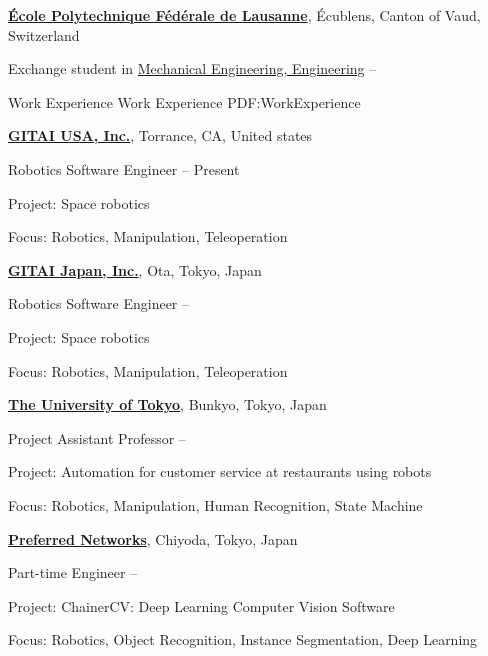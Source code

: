 \documentclass[letterpaper,MMMyyyy,nonstopmode]{simpleresumecv}
\begin{document}
\begin{Body}
\Gap
\Entry
\href{https://www.epfl.ch/en/}
{\textbf{École Polytechnique Fédérale de Lausanne}},
Écublens, Canton of Vaud, Switzerland
\Gap

\Gap
Exchange student in
\href{http://www.t.u-tokyo.ac.jp/en/foe}
{Mechanical Engineering, Engineering}
\hfill
{} --


\Section
{Work Experience}
{Work Experience}
{PDF:WorkExperience}

\Gap
\Entry
\href{https://gitai.tech/}
{\textbf{GITAI USA, Inc.}},
Torrance, CA, United states
\Gap


\Gap
Robotics Software Engineer
\hfill
{} --
Present
\begin{Detail}
Project:
Space robotics
\par
Focus:
Robotics, Manipulation, Teleoperation
\end{Detail}
\Gap

\Gap
\Entry
\href{https://gitai.tech/}
{\textbf{GITAI Japan, Inc.}},
Ota, Tokyo, Japan
\Gap


\Gap
Robotics Software Engineer
\hfill
{} --
\begin{Detail}
Project:
Space robotics
\par
Focus:
Robotics, Manipulation, Teleoperation
\end{Detail}
\Gap

\Gap
\Entry
\href{https://www.u-tokyo.ac.jp/en/}
{\textbf{The University of Tokyo}},
Bunkyo, Tokyo, Japan
\Gap

\Gap
Project Assistant Professor
\hfill
{} --
\begin{Detail}
Project:
Automation for customer service at restaurants using robots
\par
Focus:
Robotics, Manipulation, Human Recognition, State Machine
\end{Detail}
\Gap

\Gap
\Entry
\href{https://www.preferred.jp/en/}
{\textbf{Preferred Networks}},
Chiyoda, Tokyo, Japan
\Gap

\Gap
Part-time Engineer
\hfill
{} --
\begin{Detail}
Project:
ChainerCV: Deep Learning Computer Vision Software
\par
Focus:
Robotics, Object Recognition, Instance Segmentation, Deep Learning 
\end{Detail}
\Gap


\end{Body}
\end{document}
